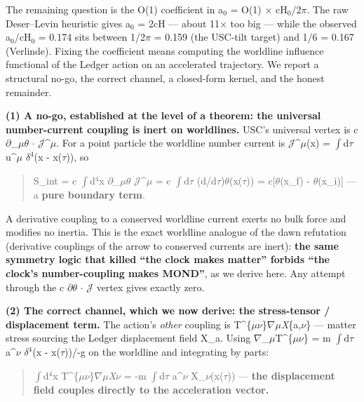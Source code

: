 \documentclass[aps,prd,preprint,nofootinbib,superscriptaddress]{revtex4-2}
\begin{document}
The remaining question is the O(1) coefficient in a\(_{0}\) = O(1) ×
cH\(_{0}\)/2\(\pi\). The raw Deser--Levin heuristic gives a\(_{0}\) =
2cH --- about 11× too big --- while the observed a\(_{0}\)/cH\(_{0}\) =
0.174 sits between 1/2\(\pi\) = 0.159 (the USC-tilt target) and 1/6 =
0.167 (Verlinde). Fixing the coefficient means computing the worldline
influence functional of the Ledger action on an accelerated trajectory.
We report a structural no-go, the correct channel, a closed-form kernel,
and the honest remainder.

\textbf{(1) A no-go, established at the level of a theorem: the
universal number-current coupling is inert on worldlines.} USC's
universal vertex is c \(\partial\)\_\(\mu\theta\) \(\cdot\)
\(\mathcal{J}\)\^{}\(\mu\). For a point particle the worldline number
current is \(\mathcal{J}\)\^{}\(\mu\)(x) = \(\int\)d\(\tau\)
u\^{}\(\mu\) \(\delta^{4}\)(x - x(\(\tau\))), so

\begin{quote}
S\_int = c \(\int\)d\(^{4}\)x \(\partial\)\_\(\mu\theta\)
\(\mathcal{J}\)\^{}\(\mu\) = c \(\int\)d\(\tau\)
(d/d\(\tau\))\(\theta\)(x(\(\tau\))) = c{[}\(\theta\)(x\_f) -
\(\theta\)(x\_i){]} --- a \textbf{pure boundary term}.
\end{quote}

A derivative coupling to a conserved worldline current exerts no bulk
force and modifies no inertia. This is the exact worldline analogue of
the dawn refutation (derivative couplings of the arrow to conserved
currents are inert): \textbf{the same symmetry logic that killed ``the
clock makes matter'' forbids ``the clock's number-coupling makes
MOND''}, as we derive here. Any attempt through the c \(\partial\theta\)
\(\cdot\) \(\mathcal{J}\) vertex gives exactly zero.

\textbf{(2) The correct channel, which we now derive: the stress-tensor
/ displacement term.} The action's \emph{other} coupling is
T\^{}\{\(\mu\nu\)\}\(\nabla\)\emph{\(\mu\)X}\{a,\(\nu\)\} --- matter
stress sourcing the Ledger displacement field X\_a. Using
\(\nabla\)\_\(\mu\)T\^{}\{\(\mu\nu\)\} = m \(\int\)d\(\tau\)
a\^{}\(\nu\) \(\delta^{4}\)(x - x(\(\tau\)))/\surd -g on the worldline
and integrating by parts:

\begin{quote}
\(\int\)d\(^{4}\)x T\^{}\{\(\mu\nu\)\}\(\nabla\)\emph{\(\mu\)X}\(\nu\) =
-m \(\int\)d\(\tau\) a\^{}\(\nu\) X\_\(\nu\)(x(\(\tau\))) ---
\textbf{the displacement field couples directly to the acceleration
vector.}
\end{quote}
\end{document}
